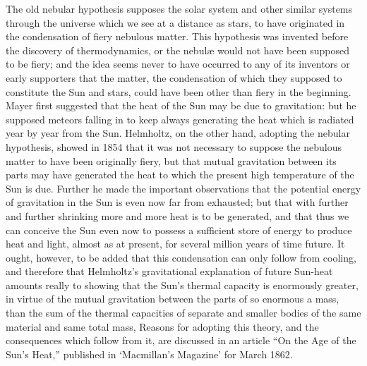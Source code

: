 \documentclass[a4paper, 11pt, oneside, english]{article}
\begin{document}
The old nebular hypothesis supposes the solar system and other similar systems through the universe which we see at a distance as stars, to have originated in the condensation of fiery nebulous matter. This hypothesis was invented before the discovery of thermodynamics, or the nebulæ would not have been supposed to be fiery; and the idea seems never to have occurred to any of its inventors or early supporters that the matter, the condensation of which they supposed to constitute the Sun and stars, could have been other than fiery in the beginning. Mayer first suggested that the heat of the Sun may be due to gravitation: but he supposed meteors falling in to keep always generating the heat which is radiated year by year from the Sun. Helmholtz, on the other hand, adopting the nebular hypothesis, showed in 1854 that it was not necessary to suppose the nebulous matter to have been originally fiery, but that mutual gravitation between its parts may have generated the heat to which the present high temperature of the Sun is due. Further he made the important observations that the potential energy of gravitation in the Sun is even now far from exhausted; but that with further and further shrinking more and more heat is to be generated, and that thus we can conceive the Sun even now to possess a sufficient store of energy to produce heat and light, almost as at present, for several million years of time future. It ought, however, to be added that this condensation can only follow from cooling, and therefore that Helmholtz's gravitational explanation of future Sun-heat amounts really to showing that the Sun's thermal capacity is enormously greater, in virtue of the mutual gravitation between the parts of so enormous a mass, than the sum of the thermal capacities of separate and smaller bodies of the same material and same total mass, Reasons for adopting this theory, and the consequences which follow from it, are discussed in an article ``On the Age of the Sun's Heat,'' published in `Macmillan's Magazine' for March 1862.
\end{document}
